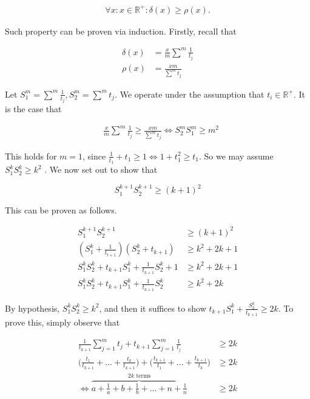 \documentclass{article}
\begin{document}
\begin{multicols}{2}
    \begin{align*}
        \forall x: x \in \mathbb{R}^+ : \delta(x) \geq \rho(x)
    .\end{align*}

Such property can be proven via induction. Firstly, recall that


\begin{align*} \delta(x) &= \frac{x}{m}\sum^m\frac{1}{t_j} \\
                \rho(x) &= \frac{xm}{\sum^m t_j} \end{align*}


Let $S_1^m = \sum^m\frac{1}{t_j}, S_2^m= \sum^m t_j$. We operate under the
assumption that $t_i \in \mathbb{R}^+$. It is the case that

\begin{align*} 
    &\frac{x}{m}\sum^m\frac{1}{t_j} \geq \frac{xm}{\sum^m t_j} \iff 
    S_2^mS_1^m \geq m^2
\end{align*}

This holds for $m=1$, since $\frac{1}{t_1}+t_1 \geq 1 \iff 1+t_1^2 \geq t_1$. So
we may assume $S^k_1 S^k_2 \geq k^2$ . We now set out to show that

\begin{equation*} 
    S^{k+1}_1 S^{k+1}_2 \geq (k+1)^2
\end{equation*}

This can be proven as follows.

\begin{align*} 
    S^{k+1}_1 S^{k+1}_2 &\geq (k+1)^2 \\ 
    (S_1^k+\frac{1}{t_{t+1}})(S_2^k+t_{k+1}) &\geq k^2+2k+1 \\
    S^k_1S^k_2+ t_{k+1}S_1^k + \frac{1}{t_{k+1}}S^k_2+1 &\geq k^2+2k+1 \\
    S^k_1S^k_2+ t_{k+1}S_1^k + \frac{1}{t_{k+1}}S^k_2 &\geq k^2+2k 
\end{align*}

By hypothesis, $S^k_1S^k_2 \geq k^2$, and then it suffices to show $t_{k+1}S_1^k +
\frac{S^k_2}{t_{k+1}}\geq 2k$. To prove this, simply observe that

\begin{align*}
    \frac{1}{t_{k+1}}\sum_{j=1}^mt_j+t_{k+1}\sum_{j=1}^m\frac{1}{t_{j}} &\geq 2k \\
    \Big(\frac{t_1}{t_{k+1}}+...+\frac{t_k}{t_{k+1}}\Big)+\Big(\frac{t_{k+1}}{t_1}+...+\frac{t_{k+1}}{t_k}\Big)
    &\geq 2k \\ \iff
    \overbrace{a+\frac{1}{a}+b+\frac{1}{b}+... +
    n+\frac{1}{n}}^{\text{$2k$ terms} } &\geq 2k
\end{align*}


\end{multicols}
\end{document}
